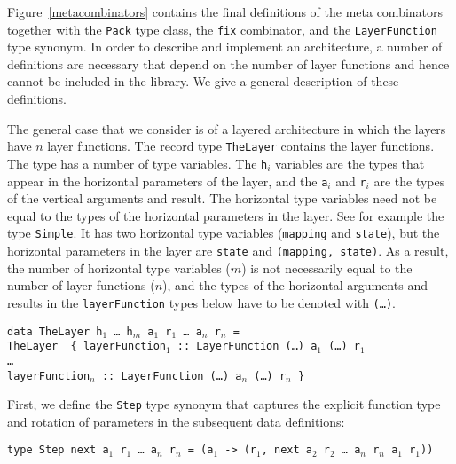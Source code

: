 Figure~\ref{metacombinators} contains the final definitions of the meta combinators together with the \texttt{Pack} type class, the \texttt{fix} combinator, and the \texttt{LayerFunction} type synonym. In order to describe and implement an architecture, a number of definitions are necessary that depend on the number of layer functions and hence cannot be included in the library. We give a general description of these definitions.


The general case that we consider is of a layered architecture in which the layers have $n$ layer functions. The record type \texttt{TheLayer} contains the layer functions. The type has a number of type variables. The \texttt{h$_i$} variables are the types that appear in the horizontal parameters of the layer, and the \texttt{a$_i$} and \texttt{r$_i$} are the types of the vertical arguments and result. The horizontal type variables need not be equal to the types of the horizontal parameters in the layer. See for example the type \texttt{Simple}. It has two horizontal type variables (\texttt{mapping} and \texttt{state}), but the horizontal parameters in the layer are \texttt{state} and \texttt{(mapping, state)}. As a result, the number of horizontal type variables ($m$) is not necessarily equal to the number of layer functions ($n$), and the types of the horizontal arguments and results in the \texttt{layerFunction} types below have to be denoted with \texttt{(\dots)}.

\begin{tabbing}
{\tt data Th}\={\tt eLayer h$_1$ \dots ~h$_m$ a$_1$ r$_1$ \dots ~a$_n$ r$_n$ = }\\
\> {\tt TheLayer~ \{~}\={\tt layerFunction$_1$}\verb| :: |{\tt LayerFunction (\dots) a$_1$ (\dots) r$_1$}\\
\>\> {\tt \dots }\\
\>\> {\tt layerFunction$_n$}\verb| :: |{\tt LayerFunction (\dots) a$_n$ (\dots) r$_n$ \}}\\
\end{tabbing}

First, we define the \texttt{Step} type synonym that captures the explicit function type and rotation of parameters in the subsequent data definitions:

\begin{tabbing}
{\tt type St}\={\tt ep next a$_1$ r$_1$ \dots~a$_n$ r$_n$ = (a$_1$ -> (r$_1$, next a$_2$ r$_2$ \dots~a$_n$ r$_n$ a$_1$ r$_1$))}
\end{tabbing}

